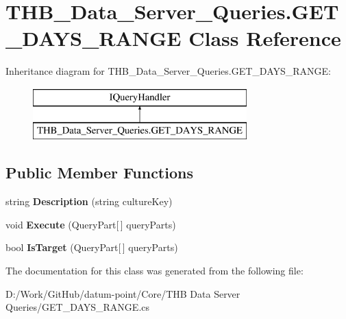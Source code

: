 \hypertarget{class_t_h_b___data___server___queries_1_1_g_e_t___d_a_y_s___r_a_n_g_e}{}\section{T\+H\+B\+\_\+\+Data\+\_\+\+Server\+\_\+\+Queries.\+G\+E\+T\+\_\+\+D\+A\+Y\+S\+\_\+\+R\+A\+N\+GE Class Reference}
\label{class_t_h_b___data___server___queries_1_1_g_e_t___d_a_y_s___r_a_n_g_e}
Inheritance diagram for T\+H\+B\+\_\+\+Data\+\_\+\+Server\+\_\+\+Queries.\+G\+E\+T\+\_\+\+D\+A\+Y\+S\+\_\+\+R\+A\+N\+GE\+:\begin{figure}[H]
\begin{center}
\leavevmode
\includegraphics[height=2.000000cm]{de/de2/class_t_h_b___data___server___queries_1_1_g_e_t___d_a_y_s___r_a_n_g_e}
\end{center}
\end{figure}
\subsection*{Public Member Functions}
\begin{DoxyCompactItemize}
\item 
\mbox{\label{class_t_h_b___data___server___queries_1_1_g_e_t___d_a_y_s___r_a_n_g_e_aa91ce7c90a325c70aab9aaf112fe49f3}} 
string {\bfseries Description} (string culture\+Key)
\item 
\mbox{\label{class_t_h_b___data___server___queries_1_1_g_e_t___d_a_y_s___r_a_n_g_e_a6c1884577a045fad484de904dc0da636}} 
void {\bfseries Execute} (Query\+Part\mbox{[}$\,$\mbox{]} query\+Parts)
\item 
\mbox{\label{class_t_h_b___data___server___queries_1_1_g_e_t___d_a_y_s___r_a_n_g_e_a1f27cee6dbc3ba3fdfad0590a75d239b}} 
bool {\bfseries Is\+Target} (Query\+Part\mbox{[}$\,$\mbox{]} query\+Parts)
\end{DoxyCompactItemize}


The documentation for this class was generated from the following file\+:\begin{DoxyCompactItemize}
\item 
D\+:/\+Work/\+Git\+Hub/datum-\/point/\+Core/\+T\+H\+B Data Server Queries/G\+E\+T\+\_\+\+D\+A\+Y\+S\+\_\+\+R\+A\+N\+G\+E.\+cs\end{DoxyCompactItemize}
